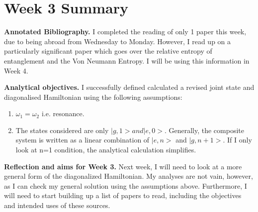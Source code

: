 \documentclass{article}
\begin{document}
\section*{Week 3 Summary}

\vspace{0.5cm}

\textbf{Annotated Bibliography.} I completed the reading of only 1 paper this week, due to being abroad from Wednesday to Monday. However, I read up on a particularly significant paper which goes over the relative entropy of entanglement and the Von Neumann Entropy. I will be using this information in Week 4. 

\vspace{0.5cm}

\textbf{Analytical objectives.} I successfully defined calculated a revised joint state and diagonalised Hamiltonian using the following assumptions:
    \begin{enumerate}
        \item {$\omega_1=\omega_2$} i.e. resonance. 
        \item The states considered are only $|g,1> and |e,0>$. Generally, the composite system is written as a linear combination of $|e,n>$ and $|g,n+1>$. If I only look at n=1 condition, the analytical calculation simplifies.
    \end{enumerate}
    
\textbf{Reflection and aims for Week 3.} Next week, I will need to look at a more general form of the diagonalized Hamiltonian. My analyses are not vain, however, as I can check my general solution using the assumptions above. Furthermore, I will need to start building up a list of papers to read, including the objectives and intended uses of these sources. 
\end{document}
